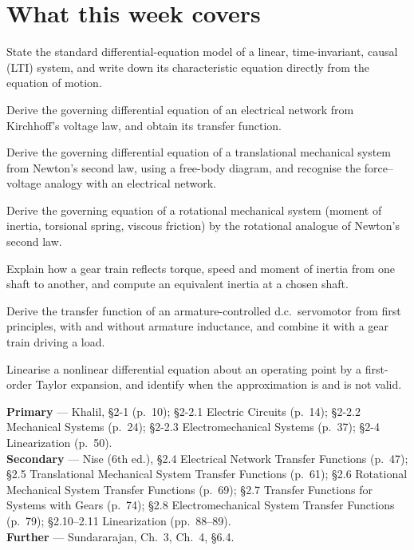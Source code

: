\documentclass[11pt,a4paper]{article}
\begin{document}
\weektitle

\section*{What this week covers}

\begin{outcomes}
\item State the standard differential-equation model of a linear, time-invariant,
      causal (LTI) system, and write down its characteristic equation directly
      from the equation of motion.
\item Derive the governing differential equation of an electrical network from
      Kirchhoff's voltage law, and obtain its transfer function.
\item Derive the governing differential equation of a translational mechanical
      system from Newton's second law, using a free-body diagram, and recognise
      the force--voltage analogy with an electrical network.
\item Derive the governing equation of a rotational mechanical system (moment
      of inertia, torsional spring, viscous friction) by the rotational analogue
      of Newton's second law.
\item Explain how a gear train reflects torque, speed and moment of inertia
      from one shaft to another, and compute an equivalent inertia at a chosen
      shaft.
\item Derive the transfer function of an armature-controlled d.c.\ servomotor
      from first principles, with and without armature inductance, and combine
      it with a gear train driving a load.
\item Linearise a nonlinear differential equation about an operating point by a
      first-order Taylor expansion, and identify when the approximation is and
      is not valid.
\end{outcomes}

\begin{readingbox}
\textbf{Primary} --- Khalil, \S2-1 (p.~10); \S2-2.1 Electric Circuits (p.~14);
\S2-2.2 Mechanical Systems (p.~24); \S2-2.3 Electromechanical Systems (p.~37);
\S2-4 Linearization (p.~50).\\
\textbf{Secondary} --- Nise (6th ed.), \S2.4 Electrical Network Transfer
Functions (p.~47); \S2.5 Translational Mechanical System Transfer Functions
(p.~61); \S2.6 Rotational Mechanical System Transfer Functions (p.~69); \S2.7
Transfer Functions for Systems with Gears (p.~74); \S2.8 Electromechanical
System Transfer Functions (p.~79); \S2.10--2.11 Linearization (pp.~88--89).\\
\textbf{Further} --- Sundararajan, Ch.~3, Ch.~4, \S6.4.
\end{readingbox}
\end{document}
